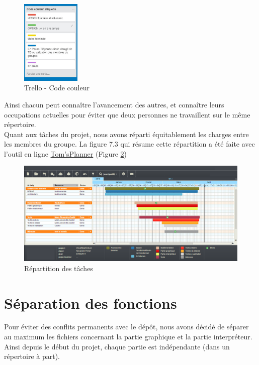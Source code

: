 \begin{figure}[H]
  \centering
    \includegraphics[width=0.25\textwidth]{images/trello_code_couleur.jpg}
        \caption{Trello - Code couleur}
        \label{fig:Code-Couleur}
\end{figure}
Ainsi chacun peut connaître l'avancement des autres, et connaître leurs occupations actuelles pour éviter que deux personnes ne travaillent sur le même répertoire.\\

Quant aux tâches du projet, nous avons réparti équitablement les charges entre les membres du groupe. La figure 7.3 qui résume cette répartition a été faite avec l'outil en ligne \href{www.tomsplanner.fr}{Tom'sPlanner} (Figure \ref{fig:Reparti-Taches})

\begin{figure}[H]
  \centering
    \includegraphics[width=1\textwidth]{images/repartition_taches.png}
        \caption{Répartition des tâches}
        \label{fig:Reparti-Taches}
\end{figure}
\newpage
\section{Séparation des fonctions}%
Pour éviter des conflits permanents avec le dépôt, nous avons décidé de séparer au maximum les fichiers concernant la partie graphique et la partie interpréteur. Ainsi depuis le début du projet, chaque partie est indépendante (dans un répertoire à part). \\

